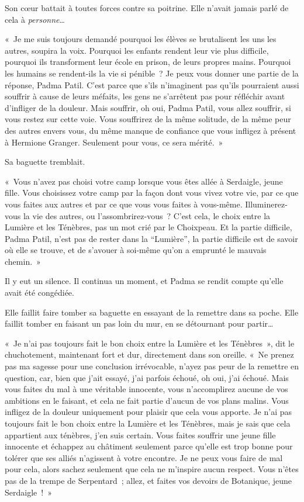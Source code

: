 Son cœur battait à toutes forces contre sa poitrine. Elle n'avait jamais parlé de cela à \emph{personne}…

«~Je me suis toujours demandé pourquoi les élèves se brutalisent les uns les autres, soupira la voix. Pourquoi les enfants rendent leur vie plus difficile, pourquoi ils transforment leur école en prison, de leurs propres mains. Pourquoi les humains se rendent-ils la vie si pénible~? Je peux vous donner une partie de la réponse, Padma Patil. C'est parce que s'ils n'imaginent pas qu'ils pourraient aussi souffrir à cause de leurs méfaits, les gens ne s'arrêtent pas pour réfléchir avant d'infliger de la douleur. Mais souffrir, oh oui, Padma Patil, vous allez souffrir, si vous restez sur cette voie. Vous souffrirez de la même solitude, de la même peur des autres envers vous, du même manque de confiance que vous infligez à présent à Hermione Granger. Seulement pour vous, ce sera mérité.~»

Sa baguette tremblait.

«~Vous n'avez pas choisi votre camp lorsque vous êtes allée à Serdaigle, jeune fille. Vous choisissez votre camp par la façon dont vous vivez votre vie, par ce que vous faites aux autres et par ce que vous vous faites à vous-même. Illuminerez-vous la vie des autres, ou l'assombrirez-vous~? C'est cela, le choix entre la Lumière et les Ténèbres, pas un mot crié par le Choixpeau. Et la partie difficile, Padma Patil, n'est pas de rester dans la “Lumière”, la partie difficile est de savoir où elle se trouve, et de s'avouer à soi-même qu'on a emprunté le mauvais chemin.~»

Il y eut un silence. Il continua un moment, et Padma se rendit compte qu'elle avait été congédiée.

Elle faillit faire tomber sa baguette en essayant de la remettre dans sa poche. Elle faillit tomber en faisant un pas loin du mur, en se détournant pour partir…

«~Je n'ai pas toujours fait le bon choix entre la Lumière et les Ténèbres~», dit le chuchotement, maintenant fort et dur, directement dans son oreille. «~Ne prenez pas ma sagesse pour une conclusion irrévocable, n'ayez pas peur de la remettre en question, car, bien que j'ait essayé, j'ai parfois échoué, oh oui, j'ai échoué. Mais vous faites du mal à une véritable innocente, vous n'accomplirez aucune de vos ambitions en le faisant, et cela ne fait partie d'aucun de vos plans malins. Vous infligez de la douleur uniquement pour plaisir que cela vous apporte. Je n'ai pas toujours fait le bon choix entre la Lumière et les Ténèbres, mais je sais que cela appartient aux ténèbres, j'en suis certain. Vous faites souffrir une jeune fille innocente et échappez au châtiment seulement parce qu'elle est trop bonne pour tolérer que ses alliés n'agissent à votre encontre. Je ne peux vous faire de mal pour cela, alors sachez seulement que cela ne m'inspire aucun respect. Vous n'êtes pas de la trempe de Serpentard~; allez, et faites vos devoirs de Botanique, jeune Serdaigle~!~»

